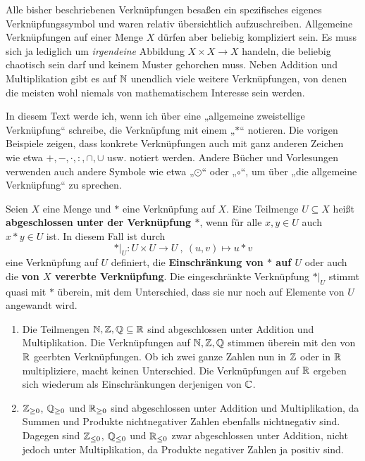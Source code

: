 \begin{bem}
    Alle bisher beschriebenen Verknüpfungen besaßen ein spezifisches eigenes Verknüpfungssymbol und waren relativ übersichtlich aufzuschreiben. Allgemeine Verknüpfungen auf einer Menge $X$ dürfen aber beliebig kompliziert sein. Es muss sich ja lediglich um \emph{irgendeine} Abbildung $X\times X\to X$ handeln, die beliebig chaotisch sein darf und keinem Muster gehorchen muss. Neben Addition und Multiplikation gibt es auf $\mathbb N$ unendlich viele weitere Verknüpfungen, von denen die meisten wohl niemals von mathematischem Interesse sein werden.
\end{bem}


\begin{nota}[Verknüpfungssymbole]
    In diesem Text werde ich, wenn ich über eine „allgemeine zweistellige Verknüpfung“ schreibe, die Verknüpfung mit einem „$*$“ notieren. Die vorigen Beispiele zeigen, dass konkrete Verknüpfungen auch mit ganz anderen Zeichen wie etwa $+,-,\cdot,:,\cap,\cup$ usw. notiert werden. Andere Bücher und Vorlesungen verwenden auch andere Symbole wie etwa „$\odot$“ oder „$\circ$“, um über „die allgemeine Verknüpfung“ zu sprechen.
\end{nota}


\begin{defin}  
    Seien $X$ eine Menge und $*$ eine Verknüpfung auf $X$. Eine Teilmenge $U\subseteq X$ heißt \textbf{abgeschlossen unter der Verknüpfung $*$}, wenn für alle $x,y\in U$ auch $x*y\in U$ ist. In diesem Fall ist durch
        \[ *\vert_U : U\times U \to U \ ,\ (u,v) \mapsto u*v \]
    eine Verknüpfung auf $U$ definiert, die \textbf{Einschränkung von $*$ auf $U$} oder auch die \textbf{von $X$ vererbte Verknüpfung}. Die eingeschränkte Verknüpfung $*\vert_U$ stimmt quasi mit $*$ überein, mit dem Unterschied, dass sie nur noch auf Elemente von $U$ angewandt wird.
\end{defin}


\begin{bsp} \quad
    \begin{enumerate}
        \item Die Teilmengen $\mathbb N,\mathbb Z,\mathbb Q\subseteq \mathbb R$ sind abgeschlossen unter Addition und Multiplikation. Die Verknüpfungen auf $\mathbb N,\mathbb Z,\mathbb Q$ stimmen überein mit den von $\mathbb R$ geerbten Verknüpfungen. Ob ich zwei ganze Zahlen nun in $\mathbb Z$ oder in $\mathbb R$ multipliziere, macht keinen Unterschied. Die Verknüpfungen auf $\mathbb R$ ergeben sich wiederum als Einschränkungen derjenigen von $\mathbb C$.
        \item $\mathbb Z_{\ge 0}$, $\mathbb Q_{\ge 0}$ und $\mathbb R_{\ge 0}$ sind abgeschlossen unter Addition und Multiplikation, da Summen und Produkte nichtnegativer Zahlen ebenfalls nichtnegativ sind. Dagegen sind $\mathbb Z_{\le 0}$, $\mathbb Q_{\le 0}$ und $\mathbb R_{\le 0}$ zwar abgeschlossen unter Addition, nicht jedoch unter Multiplikation, da Produkte negativer Zahlen ja positiv sind.
    \end{enumerate}
\end{bsp}


